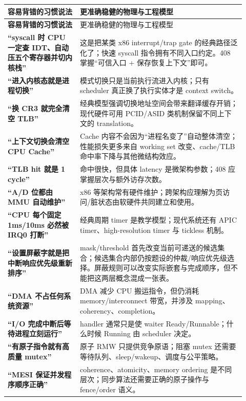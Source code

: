 \documentclass[11pt,a4paper]{ctexart}
\begin{document}
\begingroup
\small
\renewcommand{\arraystretch}{1.25}
\begin{longtable}{>{\bfseries}p{0.28\linewidth} p{0.64\linewidth}}
\toprule
容易背错的习惯说法 & 更准确稳健的物理与工程模型\\
\midrule
\endfirsthead
\toprule
容易背错的习惯说法 & 更准确稳健的物理与工程模型\\
\midrule
\endhead
“syscall 时 CPU 一定查 IDT、自动压五个寄存器并切内核栈” & 这是把某类 x86 interrupt/trap gate 的经典路径泛化了；快速 syscall 指令拥有不同入口约定。408 掌握“可信入口 + 保存恢复上下文”即可。\\
“进入内核态就是进程切换” & 模式切换只是当前执行流进入内核；只有 scheduler 真正换了执行实体才是 context switch。\\
“换 CR3 就完全清空 TLB” & 经典模型强调切换地址空间会带来翻译缓存开销；现代硬件可用 PCID/ASID 类机制保留不同上下文的 translation。\\
“上下文切换会清空 CPU Cache” & Cache 内容不会因为“进程名变了”自动整体清空；性能损失更多来自 working set 改变、cache/TLB 命中率下降与其他微结构效应。\\
“TLB hit 就是 1 cycle” & 命中很快，但具体 latency 是微架构参数；408 应掌握层次与额外访存次数。\\
“A/D 位都由 MMU 自动维护” & x86 等架构常有硬件维护；跨架构应理解为页访问/脏状态由软硬件共同建立和使用。\\
“CPU 每个固定 1ms/10ms 必然被 IRQ0 打断” & 经典周期 timer 是教学模型；现代系统还有 APIC timer、high-resolution timer 与 tickless 机制。\\
“设置屏蔽字就是把中断响应优先级重新排序” & mask/threshold 首先改变当前可递送的候选集合；候选集合内部仍按题设的仲裁/响应优先级选择。屏蔽规则可以改变实际嵌套与完成顺序，但不能把这两层概念混成一张表。\\
“DMA 不占任何系统资源” & DMA 减少 CPU 搬运指令，但仍消耗 memory/interconnect 带宽，并涉及 mapping、coherency、completion。\\
“I/O 完成中断后等待进程立刻运行” & handler 通常只是使 waiter Ready/Runnable；什么时候 Running 由 scheduler 决定。\\
“有原子指令就有高质量 mutex” & 原子 RMW 只提供竞争原语；阻塞 mutex 还需要等待队列、sleep/wakeup、调度与公平策略。\\
“MESI 保证并发程序顺序正确” & coherence、atomicity、memory ordering 是不同层次；同步算法还需要正确的原子操作与 fence/order 语义。\\
\bottomrule
\end{longtable}
\endgroup
\end{document}
